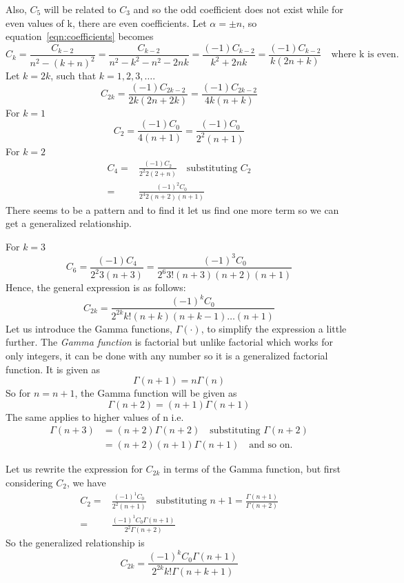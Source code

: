 Also, $C_5$ will be related to $C_3$ and so the odd coefficient does not exist while for even values of k, there are even coefficients. Let $\alpha = \pm n$, so equation~\eqref{eqn:coefficients} becomes 
\begin{dmath*}
C_k = \frac{C_{k-2}}{n^2 - (k + n)^2} 
= \frac{C_{k-2}}{n^2 - k^2 - n^2 - 2nk}
=\frac{(-1) C_{k-2}}{k^2 + 2nk} 
= \frac{(-1) C_{k-2}}{k(2n + k)}\quad\text{where k is even.}
\end{dmath*} 
Let $k =2k$, such that $k = 1, 2, 3, \ldots$.
\begin{dmath}
C_{2k} = \frac{(-1) C_{2k-2}}{2k(2n + 2k)} 
= \frac{(-1) C_{2k-2}}{4k(n + k)}
\label{eqn:coefficients2}  
\end{dmath}
For $k=1$
\[
C_2 = \frac{(-1) C_0}{4(n + 1)} = \frac{(-1) C_0}{2^2(n + 1)}
\]
For $k = 2$
\begin{align*}
C_4 =& \frac{(-1) C_2}{2^2 2(2 + n)}\quad\text{substituting }C_2\\
=& \frac{(-1)^2 C_0}{2^4 2(n + 2)(n + 1)}
\end{align*}
There seems to be a pattern and to find it let us find one more term so we can get a generalized relationship.

For $k = 3$
\begin{dmath*}
C_6 = \frac{(-1) C_4}{2^2 3(n + 3)}
= \frac{(-1)^3 C_0}{2^6 3!(n + 3)(n + 2)(n + 1)}
\end{dmath*}
Hence, the general expression is as follows:
\begin{equation} 
C_{2k} = \frac{(-1)^k C_0}{2^{2k} k!(n + k)(n + k-1)\ldots(n + 1)}
\end{equation}
Let us introduce the Gamma functions, $\Gamma(\cdot)$, to simplify the expression a little further. The \emph{Gamma function} is factorial but unlike factorial which works for only integers, it can be done with any number so it is a generalized factorial function. It is given as 
\[
\Gamma(n + 1) = n \Gamma(n)
\]
So for $n = n + 1$, the Gamma function will be given as
\[
\Gamma(n + 2) = (n + 1)\Gamma(n + 1)
\]
The same applies to higher values of n i.e. 
\begin{align*}
\Gamma(n + 3) &= (n + 2)\Gamma(n + 2)\quad\text{substituting }\Gamma(n + 2)\\
&= (n + 2)(n + 1)\Gamma(n + 1)\quad\text{and so on.}
\end{align*}

Let us rewrite the expression for $C_{2k}$ in terms of the Gamma function, but first considering $C_2$, we have
\begin{align*}
C_2 =& \frac{(-1)^1 C_0}{2^2(n + 1)}\quad\text{substituting }n + 1 = \frac{\Gamma(n + 1)}{\Gamma(n + 2)}\\
=& \frac{(-1)^1 C_0 \Gamma(n + 1)}{2^2 \Gamma(n + 2)}
\end{align*}
So the generalized relationship is 
\begin{equation}
C_{2k} =  \frac{(-1)^k C_0 \Gamma(n + 1)}{2^{2k} k! \Gamma(n + k + 1)}
\label{eqn:coefficients3}
\end{equation}

